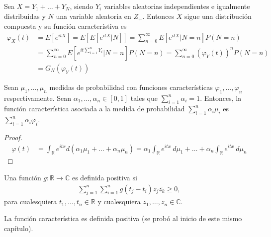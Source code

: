 \begin{obs}
    Sea $X = Y_1+\ldots+Y_N$, siendo $Y_i$ variables aleatorias independientes e igualmente distribuidas y $N$ una variable aleatoria en $Z_+$. Entonces $X$ sigue una distribución compuesta y su función característiva es
    \begin{align*}
        \varphi_X(t) & = E \left[e^{itX} \right] = E\left[ E \left[e^{itX} | N \right]\right] = \sum_{n=0}^{\infty} E \left[ e^{itX} | N = n \right] P(N = n)         \\
                     & = \sum_{n=0}^{\infty} E \left[ e^{it \sum_{i=1}^{n} Y_i} | N = n \right] P(N = n) = \sum_{n=0}^{\infty} \left( \varphi_Y(t) \right)^n P(N = n) \\
                     & = G_N \left( \varphi_Y(t) \right)
    \end{align*}
\end{obs}

\begin{lema}
    Sean $\mu_1,\ldots,\mu_n$ medidas de probabilidad con funciones características $\varphi_1,\ldots,\varphi_n$ respectivamente. Sean $\alpha_1,\ldots,\alpha_n \in [0,1]$ tales que $\sum_{i=1}^{n} \alpha_i = 1$. Entonces, la función característica asociada a la medida de probabilidad $\sum_{i=1}^{n} \alpha_i \mu_i$ es $\sum_{i=1}^{n} \alpha_i \varphi_i$.
\end{lema}

\begin{proof}
    \begin{align*}
        \varphi(t) & = \int_{\mathbb{R}} e^{itx} d(\alpha_1 \mu_1 + \ldots + \alpha_n \mu_n)
        = \alpha_1 \int_{\mathbb{R}} e^{itx} \ d\mu_1 + \ldots + \alpha_n \int_{\mathbb{R}} e^{itx} \ d\mu_n
    \end{align*}
\end{proof}

\begin{defi}
    Una función $g : \mathbb{R} \longrightarrow \mathbb{C}$ es definida positiva si
    \begin{align*}
        \sum_{j=1}^{n} \sum_{i=1}^{n} g(t_j - t_i) z_j \overline{z_k} \ge 0,
    \end{align*}
    para cualesquiera $t_1,\ldots,t_ n\in \mathbb{R}$ y cualesquiera $z_1,\ldots,z_n\in \mathbb{C}$.
\end{defi}

\begin{obs}
    La función característica es definida positiva (se probó al inicio de este mismo capítulo).
\end{obs}

